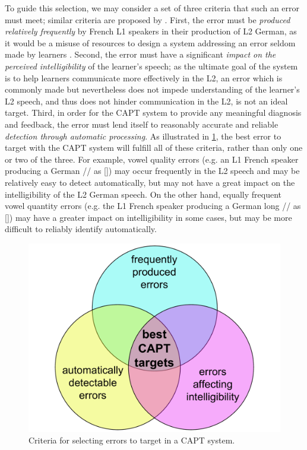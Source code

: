 	To guide this selection, we may consider %
a set of three criteria that such an error must meet; similar criteria are proposed by \textcite{Cucchiarini2009}.
%
First, 
the error must be \textit{produced relatively frequently} by French L1 speakers in their production of L2 German, as it would be a misuse of resources to design a system addressing an error seldom made by learners \citep{Neri2002}.
Second,
the error must have a significant \textit{impact on the perceived intelligibility} of the learner's speech; 
as the ultimate goal of the system is to help learners communicate more effectively in the L2,
 an error which is commonly made but nevertheless does not impede understanding of the learner's L2 speech, and thus does not hinder communication in the L2, is not an ideal target. %
Third,
in order for the CAPT system to provide any meaningful diagnosis and feedback, the error must lend itself to reasonably accurate and reliable  \textit{detection through automatic processing}. 
%
%
%
As illustrated in \cref{fig:errors}, the best error to target with the CAPT system will fulfill all of these criteria, rather than only one or two of the three. 
	 For example, vowel quality errors (e.g. an L1 French speaker producing a German // as [\textipa{\oe}]) may occur frequently in the L2 speech and may be relatively easy to detect automatically, but may not have a great impact on the intelligibility of the L2 German speech. On the other hand, equally frequent vowel quantity errors (e.g. the L1 French speaker producing a German long // as []) may have a greater impact on intelligibility in some cases, but may be more difficult to reliably identify automatically.

		\begin{figure}[htb]
			\centering
			\includegraphics[width=.7\textwidth]{img/error-venn}
			\caption{Criteria for selecting errors to target in a CAPT system.}
			\label{fig:errors}
		\end{figure}

